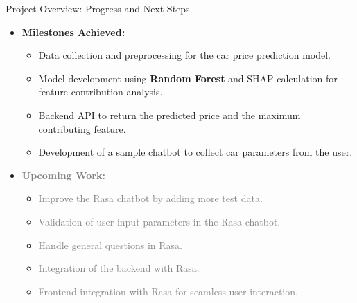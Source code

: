 \documentclass{beamer}
\begin{document}
\begin{frame}{Project Overview: Progress and Next Steps}
    \begin{itemize}
        \item \textbf{Milestones Achieved:}
        \begin{itemize}
            \item Data collection and preprocessing for the car price prediction model.
            \item Model development using \textbf{Random Forest} and SHAP calculation for feature contribution analysis.
            \item Backend API to return the predicted price and the maximum contributing feature.
            \item Development of a sample chatbot to collect car parameters from the user.
        \end{itemize}
        
        \item \textbf{\textcolor{gray}{Upcoming Work:}}
        \begin{itemize}
            \item \textcolor{gray}{Improve the Rasa chatbot by adding more test data.}
            \item \textcolor{gray}{Validation of user input parameters in the Rasa chatbot.}
            \item \textcolor{gray}{Handle general questions in Rasa.}
            \item \textcolor{gray}{Integration of the backend with Rasa.}
            \item \textcolor{gray}{Frontend integration with Rasa for seamless user interaction.}
        \end{itemize}
    \end{itemize}
\end{frame}
\end{document}

